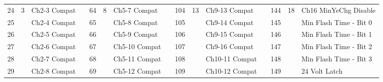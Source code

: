 \documentclass[]{article}
\begin{document}
\begin{landscape}
\begin{table}[]
\begin{tabular}{lllllllllllllll}
			24           & \multirow{-8}{*}{3} & Ch2-3  Compat                  &                    & 64           & \multirow{-8}{*}{8}  & Ch5-7  Compat     &  & 104          & \multirow{-8}{*}{13} & Ch9-13  Compat    &  & 144                                                                                             & \multirow{-8}{*}{18}                         & Ch16 MinYeChg Disable                              \\ \cline{1-3} \cline{5-7} \cline{9-11} \cline{13-15} 
			25           &                     & Ch2-4  Compat                  &                    & 65           &                      & Ch5-8  Compat     &  & 105          &                      & Ch9-14  Compat    &  & 145                                                                                             &                                              & Min Flash Time - Bit 0                             \\
			26           &                     & Ch2-5  Compat                  &                    & 66           &                      & Ch5-9  Compat     &  & 106          &                      & Ch9-15  Compat    &  & 146                                                                                             &                                              & Min Flash Time - Bit 1                             \\
			27           &                     & Ch2-6  Compat                  &                    & 67           &                      & Ch5-10  Compat    &  & 107          &                      & Ch9-16  Compat    &  & 147                                                                                             &                                              & Min Flash Time - Bit 2                             \\
			28           &                     & Ch2-7  Compat                  &                    & 68           &                      & Ch5-11  Compat    &  & 108          &                      & Ch10-11  Compat   &  & 148                                                                                             &                                              & Min Flash Time - Bit 3                             \\
			29           &                     & Ch2-8  Compat                  &                    & 69           &                      & Ch5-12  Compat    &  & 109          &                      & Ch10-12  Compat   &  & 149                                                                                             &                                              & 24 Volt Latch                                      \\

\end{tabular}
\end{table}
\end{landscape}
\end{document}
